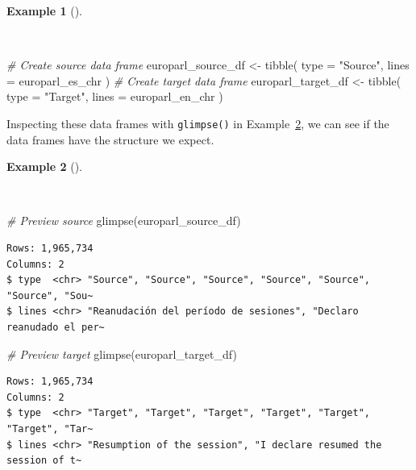 \documentclass[
  letterpaper,
]{latex/krantz}
\newenvironment{Shaded}{\begin{snugshade}}{\end{snugshade}}
\newcommand{\AttributeTok}[1]{\textcolor[rgb]{0.00,0.00,0.00}{#1}}
\newcommand{\CommentTok}[1]{\textcolor[rgb]{0.00,0.00,0.00}{\textit{#1}}}
\newcommand{\FunctionTok}[1]{\textcolor[rgb]{0.00,0.00,0.00}{#1}}
\newcommand{\NormalTok}[1]{\textcolor[rgb]{0.00,0.00,0.00}{#1}}
\newcommand{\OtherTok}[1]{\textcolor[rgb]{0.00,0.00,0.00}{#1}}
\newcommand{\StringTok}[1]{\textcolor[rgb]{0.00,0.00,0.00}{#1}}
\theoremstyle{definition}
\newtheorem{example}{Example}[chapter]
\theoremstyle{remark}
\begin{document}
\begin{example}[]\protect\hypertarget{exm-curate-europarl-df}{}\label{exm-curate-europarl-df}

~

\begin{Shaded}
\begin{Highlighting}[]
\CommentTok{\# Create source data frame}
\NormalTok{europarl\_source\_df }\OtherTok{\textless{}{-}}
  \FunctionTok{tibble}\NormalTok{(}
    \AttributeTok{type =} \StringTok{"Source"}\NormalTok{,}
    \AttributeTok{lines =}\NormalTok{ europarl\_es\_chr}
\NormalTok{  )}
\CommentTok{\# Create target data frame}
\NormalTok{europarl\_target\_df }\OtherTok{\textless{}{-}}
  \FunctionTok{tibble}\NormalTok{(}
    \AttributeTok{type =} \StringTok{"Target"}\NormalTok{,}
    \AttributeTok{lines =}\NormalTok{ europarl\_en\_chr}
\NormalTok{  )}
\end{Highlighting}
\end{Shaded}

\end{example}

Inspecting these data frames with \texttt{glimpse()} in
Example~\ref{exm-curate-europarl-glimpse}, we can see if the data frames
have the structure we expect.

\begin{example}[]\protect\hypertarget{exm-curate-europarl-glimpse}{}\label{exm-curate-europarl-glimpse}

~

\begin{Shaded}
\begin{Highlighting}[]
\CommentTok{\# Preview source}
\FunctionTok{glimpse}\NormalTok{(europarl\_source\_df)}
\end{Highlighting}
\end{Shaded}

\begin{verbatim}
Rows: 1,965,734
Columns: 2
$ type  <chr> "Source", "Source", "Source", "Source", "Source", "Source", "Sou~
$ lines <chr> "Reanudación del período de sesiones", "Declaro reanudado el per~
\end{verbatim}

\begin{Shaded}
\begin{Highlighting}[]
\CommentTok{\# Preview target}
\FunctionTok{glimpse}\NormalTok{(europarl\_target\_df)}
\end{Highlighting}
\end{Shaded}

\begin{verbatim}
Rows: 1,965,734
Columns: 2
$ type  <chr> "Target", "Target", "Target", "Target", "Target", "Target", "Tar~
$ lines <chr> "Resumption of the session", "I declare resumed the session of t~
\end{verbatim}

\end{example}
\end{document}
